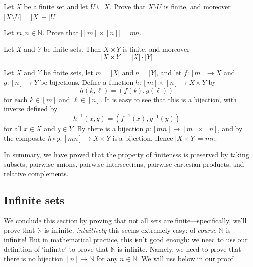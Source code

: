 \begin{exercise}
Let $X$ be a finite set and let $U \subseteq X$. Prove that $X \setminus U$ is finite, and moreover $|X \setminus U| = |X| - |U|$.
\end{exercise}

\begin{exercise}
\label{exSizeOfCartesianProduct}
Let $m,n \in \mathbb{N}$. Prove that $|[m] \times [n]| = mn$.
\end{exercise}

\begin{proposition}
\label{propProductOfFiniteSetsIsFinite}
Let $X$ and $Y$ be finite sets. Then $X \times Y$ is finite, and moreover
\[ |X \times Y| = |X| \cdot |Y| \]
\end{proposition}
\begin{cproof}
Let $X$ and $Y$ be finite sets, let $m=|X|$ and $n=|Y|$, and let $f : [m] \to X$ and $g : [n] \to Y$ be bijections. Define a function $h : [m] \times [n] \to X \times Y$ by
\[ h(k,\ell) = (f(k),g(\ell)) \]
for each $k \in [m]$ and $\ell \in [n]$. It is easy to see that this is a bijection, with inverse defined by
\[ h^{-1}(x,y) = (f^{-1}(x), g^{-1}(y)) \]
for all $x \in X$ and $y \in Y$. By  there is a bijection $p : [mn] \to [m] \times [n]$, and by  the composite $h \circ p : [mn] \to X \times Y$ is a bijection. Hence $|X \times Y| = mn$.
\end{cproof}

In summary, we have proved that the property of finiteness is preserved by taking subsets, pairwise unions, pairwise intersections, pairwise cartesian products, and relative complements. 

\subsection*{Infinite sets}

We conclude this section by proving that not all sets are finite---specifically, we'll prove that $\mathbb{N}$ is infinite. \textit{Intuitively} this seems extremely easy: of \textit{course} $\mathbb{N}$ is infinite! But in mathematical practice, this isn't good enough: we need to use our definition of `infinite' to prove that $\mathbb{N}$ is infinite. Namely, we need to prove that there is no bijection $[n] \to \mathbb{N}$ for any $n \in \mathbb{N}$. We will use  below in our proof.

